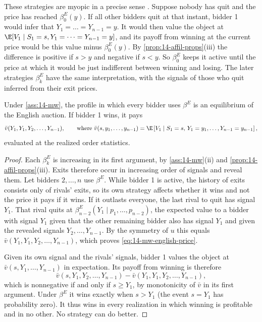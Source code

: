 These strategies are myopic in a precise sense \citep[p.~1105]{MilgromWeber1982}. Suppose nobody has quit
and the price has reached $\beta^E_0(y)$. If all other bidders quit at that instant, bidder 1 would infer that
$Y_1=\dots=Y_{n-1}=y$. It would then value the object at $\E[V_1\mid S_1=s,Y_1=\dots=Y_{n-1}=y]$, and its
payoff from winning at the current price would be this value minus $\beta^E_0(y)$. By \cref{prop:14-affil-props}(iii)
the difference is positive if $s>y$ and negative if $s<y$. So $\beta^E_0$ keeps it active until the price
at which it would be just indifferent between winning and losing. The later strategies $\beta^E_k$ have the
same interpretation, with the signals of those who quit inferred from their exit prices.

\begin{proposition}\label{prop:14-mw-english}
Under \cref{ass:14-mw}, the profile in which every bidder uses $\beta^E$ is an equilibrium of the English
auction. If bidder 1 wins, it pays
\begin{equation}\label{eq:14-mw-english-price}
  \bar v(Y_1,Y_1,Y_2,\dots,Y_{n-1}),\qquad\text{where }
  \bar v(s,y_1,\dots,y_{n-1})=\E\left[V_1\mid S_1=s,\,Y_1=y_1,\dots,Y_{n-1}=y_{n-1}\right],
\end{equation}
evaluated at the realized order statistics.
\end{proposition}

\begin{proof}
Each $\beta^E_k$ is increasing in its first argument, by \cref{ass:14-mw}(ii) and
\cref{prop:14-affil-props}(iii). Exits therefore occur in increasing order of signals and reveal them. Let
bidders $2,\dots,n$ use $\beta^E$. While bidder 1 is active, the history of exits consists only of rivals'
exits, so its own strategy affects whether it wins and not the price it pays if it wins. If it outlasts
everyone, the last rival to quit has signal $Y_1$. That rival quits at $\beta^E_{n-2}(Y_1\mid p_1,\dots,p_{n-2})$,
the expected value to a bidder with signal $Y_1$ given that the other remaining bidder also has signal $Y_1$
and given the revealed signals $Y_2,\dots,Y_{n-1}$. By the symmetry of $u$ this equals
$\bar v(Y_1,Y_1,Y_2,\dots,Y_{n-1})$, which proves \eqref{eq:14-mw-english-price}.

Given its own signal and the rivals' signals, bidder 1 values the object at
$\bar v(s,Y_1,\dots,Y_{n-1})$ in expectation. Its payoff from winning is therefore
\begin{equation*}
  \bar v(s,Y_1,Y_2,\dots,Y_{n-1})-\bar v(Y_1,Y_1,Y_2,\dots,Y_{n-1}),
\end{equation*}
which is nonnegative if and only if $s\ge Y_1$, by monotonicity of $\bar v$ in its first argument. Under
$\beta^E$ it wins exactly when $s>Y_1$ (the event $s=Y_1$ has probability zero). It thus wins in every
realization in which winning is profitable and in no other. No strategy can do better.
\end{proof}

